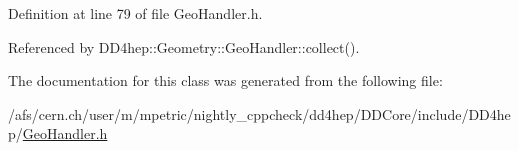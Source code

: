 Definition at line 79 of file GeoHandler.h.

Referenced by DD4hep::Geometry::GeoHandler::collect().

The documentation for this class was generated from the following file:\begin{DoxyCompactItemize}
\item 
/afs/cern.ch/user/m/mpetric/nightly\_\-cppcheck/dd4hep/DDCore/include/DD4hep/\hyperlink{_geo_handler_8h}{GeoHandler.h}\end{DoxyCompactItemize}
